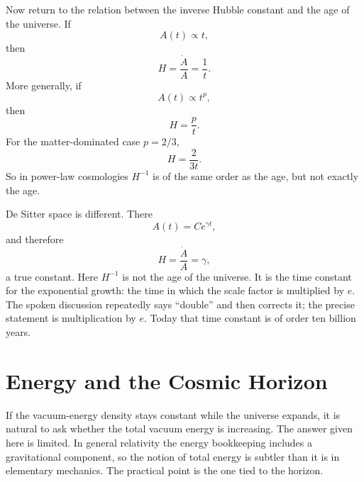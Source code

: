 Now return to the relation between the inverse Hubble constant and the age of the universe. If
\begin{equation}
A(t)\propto t,
\end{equation}
then
\begin{equation}
H=\frac{\dot A}{A}=\frac{1}{t}.
\end{equation}
More generally, if
\begin{equation}
A(t)\propto t^p,
\end{equation}
then
\begin{equation}
H=\frac{p}{t}.
\end{equation}
For the matter-dominated case \(p=2/3\),
\begin{equation}
H=\frac{2}{3t}.
\end{equation}
So in power-law cosmologies \(H^{-1}\) is of the same order as the age, but not exactly the age.

De Sitter space is different. There
\begin{equation}
A(t)=C e^{\gamma t},
\end{equation}
and therefore
\begin{equation}
H=\frac{\dot A}{A}=\gamma,
\end{equation}
a true constant. Here \(H^{-1}\) is not the age of the universe. It is the time constant for the exponential growth: the time in which the scale factor is multiplied by \(e\). The spoken discussion repeatedly says ``double'' and then corrects it; the precise statement is multiplication by \(e\). Today that time constant is of order ten billion years.

\begin{classroomqa}
\end{classroomqa}

\section{Energy and the Cosmic Horizon}

If the vacuum-energy density stays constant while the universe expands, it is natural to ask whether the total vacuum energy is increasing. The answer given here is limited. In general relativity the energy bookkeeping includes a gravitational component, so the notion of total energy is subtler than it is in elementary mechanics. The practical point is the one tied to the horizon.

